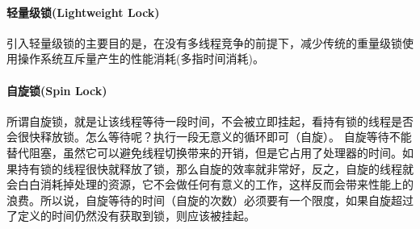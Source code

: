 \documentclass[../../../interview-questions.tex]{subfiles}
\begin{document}
\paragraph{轻量级锁(Lightweight Lock)}
引入轻量级锁的主要目的是，在没有多线程竞争的前提下，减少传统的重量级锁使用操作系统互斥量产生的性能消耗(多指时间消耗)。

\paragraph{自旋锁(Spin Lock)}所谓自旋锁，就是让该线程等待一段时间，不会被立即挂起，看持有锁的线程是否会很快释放锁。怎么等待呢？执行一段无意义的循环即可（自旋）。
自旋等待不能替代阻塞，虽然它可以避免线程切换带来的开销，但是它占用了处理器的时间。如果持有锁的线程很快就释放了锁，那么自旋的效率就非常好，反之，自旋的线程就会白白消耗掉处理的资源，它不会做任何有意义的工作，这样反而会带来性能上的浪费。所以说，自旋等待的时间（自旋的次数）必须要有一个限度，如果自旋超过了定义的时间仍然没有获取到锁，则应该被挂起。
\end{document}
